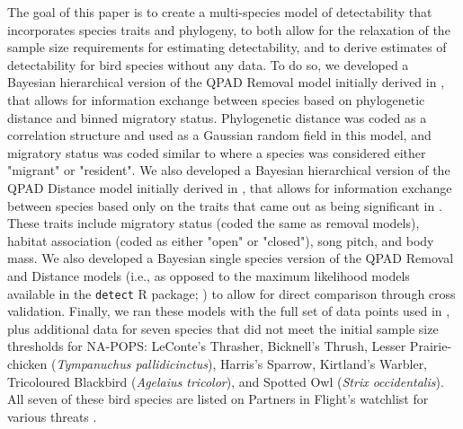 \documentclass[12pt]{article}
\begin{document}
\par The goal of this paper is to create a multi-species model of detectability that incorporates species traits and phylogeny, to both allow for the relaxation of the sample size requirements for estimating detectability, and to derive estimates of detectability for bird species without any data. 
To do so, we developed a Bayesian hierarchical version of the QPAD Removal model initially derived in \cite{solymos_calibrating_2013}, that allows for information exchange between species based on phylogenetic distance and binned migratory status.
Phylogenetic distance was coded as a correlation structure and used as a Gaussian random field in this model, and migratory status was coded similar to \cite{solymos_phylogeny_2018} where a species was considered either "migrant" or "resident".
We also developed a Bayesian hierarchical version of the QPAD Distance model initially derived in \cite{solymos_calibrating_2013}, that allows for information exchange between species based only on the traits that came out as being significant in  \cite{solymos_phylogeny_2018}.
These traits include migratory status (coded the same as removal models), habitat association (coded as either "open" or "closed"), song pitch, and body mass. 
We also developed a Bayesian single species version of the QPAD Removal and Distance models (i.e., as opposed to the maximum likelihood models available in the \texttt{detect} R package; \cite{solymos_detect_2020}) to allow for direct comparison through cross validation.
Finally, we ran these models with the full set of data points used in \cite{edwards_point_2023}, plus additional data for seven species that did not meet the initial sample size thresholds for NA-POPS: LeConte's Thrasher, Bicknell's Thrush, Lesser Prairie-chicken (\textit{Tympanuchus pallidicinctus}), Harris's Sparrow, Kirtland's Warbler, Tricoloured Blackbird (\textit{Agelaius tricolor}), and Spotted Owl (\textit{Strix occidentalis}). 
All seven of these bird species are listed on Partners in Flight's watchlist for various threats \citep{will_handbook_2020}. 
\end{document}
